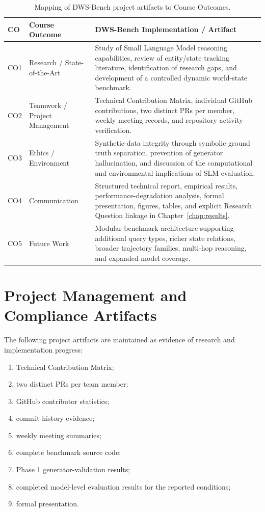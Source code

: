 \documentclass{iutbscthesis}
\begin{document}
\begin{table}[H]
\centering
\small
\renewcommand{\arraystretch}{1.3}
\begin{tabular}{p{}p{}p{}}
\toprule
\textbf{CO} & \textbf{Course Outcome} & \textbf{DWS-Bench Implementation / Artifact} \\
\midrule
CO1 & Research / State-of-the-Art & Study of Small Language Model reasoning capabilities, review of
entity/state tracking literature, identification of research gaps, and development of a controlled dynamic
world-state benchmark. \\
CO2 & Teamwork / Project Management & Technical Contribution Matrix, individual GitHub
contributions, two distinct PRs per member, weekly meeting records, and repository activity
verification. \\
CO3 & Ethics / Environment & Synthetic-data integrity through symbolic ground truth separation,
prevention of generator hallucination, and discussion of the computational and environmental
implications of SLM evaluation. \\
CO4 & Communication & Structured technical report, empirical results, performance-degradation analysis, formal
presentation, figures, tables, and explicit Research Question linkage in Chapter~\ref{chap:results}. \\
CO5 & Future Work & Modular benchmark architecture supporting additional query types, richer state
relations, broader trajectory families, multi-hop reasoning, and expanded model coverage. \\
\bottomrule
\end{tabular}
\caption{Mapping of DWS-Bench project artifacts to Course Outcomes.}
\label{tab:co-mapping}
\end{table}

\section{Project Management and Compliance Artifacts}
The following project artifacts are maintained as evidence of research and implementation progress:
\begin{enumerate}
\item Technical Contribution Matrix;
\item two distinct PRs per team member;
\item GitHub contributor statistics;
\item commit-history evidence;
\item weekly meeting summaries;
\item complete benchmark source code;
\item Phase 1 generator-validation results;
\item completed model-level evaluation results for the reported conditions;
\item formal presentation.
\end{enumerate}
\end{document}
